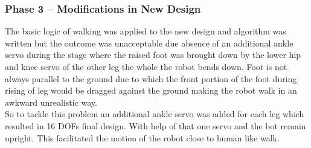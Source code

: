 \documentclass[12pt]{article}
\begin{document}
\subsubsection{Phase 3 – Modifications in New Design}
The basic logic of walking was applied to the new design and algorithm was written but
the outcome was unacceptable due absence of an additional ankle servo during the stage
where the raised foot was brought down by the lower hip and knee servo of the other leg
the whole the robot bends down. Foot is not always parallel to the ground due to which the
front portion of the foot during rising of leg would be dragged against the ground making
the robot walk in an awkward unrealistic way.\\
So to tackle this problem an additional ankle servo was added for each leg which resulted
in 16 DOFs final design. With help of that one servo and the bot remain upright. This
facilitated the motion of the robot close to human like walk.
\end{document}
